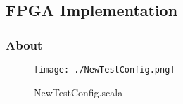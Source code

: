 
\subsection{FPGA Implementation}


\subsubsection{About}


\begin{figure}[h!tbp]
  \centering
  \texttt{[image: ./NewTestConfig.png]}
  \caption{NewTestConfig.scala}
  \label{fig:newtestconfig}
\end{figure}

